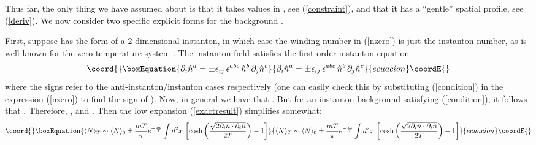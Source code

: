 \documentclass[a4paper,prd]{revtex4}
\begin{document}
Thus far, the only thing we have assumed about
\coordHE{} is that it takes values in \coordHE{},  see
(\ref{constraint}), and that it has a ``gentle'' spatial profile, see
(\ref{deriv}). We now consider two specific explicit forms for the
background \coordHE{}. 

First, suppose \coordHE{} has the form of a 2-dimensional
\coordHE{} instanton, in which case the winding number \coordHE{} in (\ref{nzero}) is just the instanton number, as is well
known for the zero temperature system \cite{raj}. 
The instanton field \coordHE{} satisfies the
first order instanton equation
\begin{equation}\coord{}\boxEquation{
\partial_{i} \hat{n}^{a}=\pm \epsilon_{ij}\, \epsilon^{abc}\, \hat{n}^{b}\, 
\partial_{j} \hat{n}^{c}
\label{condition}
}{
\partial_{i} \hat{n}^{a}=\pm \epsilon_{ij}\, \epsilon^{abc}\, \hat{n}^{b}\, 
\partial_{j} \hat{n}^{c}
}{ecuacion}\coordE{}\end{equation}
where the \myHighlight{$\pm$}\coordHE{} signs refer to the anti-instanton/instanton cases
respectively (one can easily check this by substituting (\ref{condition})
in the expression (\ref{nzero}) to find the sign of  \coordHE{}). Now, in general we have that \coordHE{}. But for an instanton background \coordHE{}
satisfying (\ref{condition}), it follows that
\coordHE{}. Therefore,
\coordHE{}, and \coordHE{}. Then the low \coordHE{} expansion (\ref{exactresult}) simplifies
somewhat:
\begin{equation}\coord{}\boxEquation{
\langle N\rangle _{T} \sim \langle N\rangle _{0} \pm 
\frac{m T}{\pi} e^{-\frac{m}{T}} \int d^{2}x\, \left[\cosh\left(\frac{\sqrt{2 \partial_{i}\hat{n}\cdot
\partial_{i} \hat{n}}}{2 T}\right)-1\right]
\label{instantonfn}
}{
\langle N\rangle _{T} \sim \langle N\rangle _{0} \pm 
\frac{m T}{\pi} e^{-\frac{m}{T}} \int d^{2}x\, \left[\cosh\left(\frac{\sqrt{2 \partial_{i}\hat{n}\cdot
\partial_{i} \hat{n}}}{2 T}\right)-1\right]
}{ecuacion}\coordE{}\end{equation}
\end{document}
